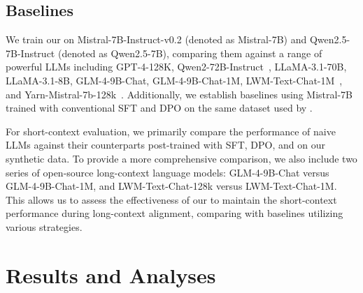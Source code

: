 \subsection{Baselines}

We train our \ourMethod{} on Mistral-7B-Instruct-v0.2 (denoted as Mistral-7B) and Qwen2.5-7B-Instruct (denoted as Qwen2.5-7B), comparing them against a range of powerful LLMs including GPT-4-128K, Qwen2-72B-Instruct~\citep{yang2024qwen2technicalreport}, LLaMA-3.1-70B, LLaMA-3.1-8B, GLM-4-9B-Chat, GLM-4-9B-Chat-1M, LWM-Text-Chat-1M~\citep{liu2023world}, and Yarn-Mistral-7b-128k~\citep{peng2023yarn}. Additionally, we establish baselines using Mistral-7B trained with conventional SFT and DPO on the same dataset used by \ourMethod{}.

For short-context evaluation, we primarily compare the performance of naive LLMs against their counterparts post-trained with SFT, DPO, and \ourMethod{} on our synthetic data. To provide a more comprehensive comparison, we also include two series of open-source long-context language models: GLM-4-9B-Chat versus GLM-4-9B-Chat-1M, and LWM-Text-Chat-128k versus LWM-Text-Chat-1M. This allows us to assess the effectiveness of our \ourMethod{} to maintain the short-context performance during long-context alignment, comparing with baselines utilizing various strategies.

















\section{Results and Analyses}
\label{sec:experiment}

